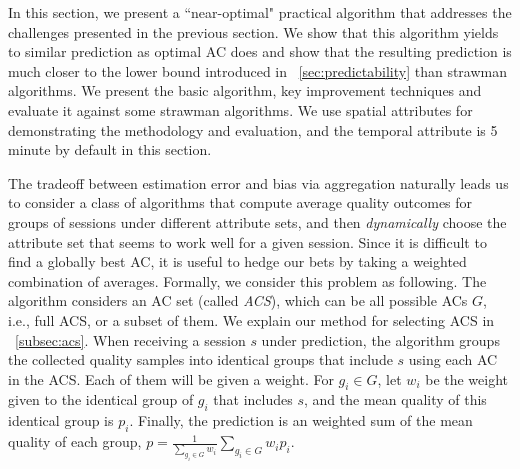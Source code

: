 \label{sec:prediction}
In this section, we present a ``near-optimal" practical algorithm that addresses the challenges presented in the previous section. We show that this algorithm yields to similar prediction as optimal AC does and show that the resulting prediction is much closer to the lower bound introduced in \Section~\ref{sec:predictability} than strawman algorithms. We present the basic algorithm, key improvement techniques and evaluate it against some strawman algorithms. We use spatial attributes for demonstrating the methodology and evaluation, and the temporal attribute is 5 minute by default in this section.

The tradeoff between estimation error and bias via aggregation naturally leads us to consider a class of algorithms that compute average quality outcomes for groups of sessions under different attribute sets, and then {\it dynamically} choose the attribute set that seems to work well for a given session.  Since it is difficult to find a globally best AC, it is useful to hedge our bets by taking a weighted combination of averages.  Formally, we consider this problem as following. The algorithm considers an AC set (called {\it ACS}), which can be all possible ACs $G$, i.e., full ACS, or a subset of them. We explain our method for selecting ACS in \Section~\ref{subsec:acs}. When receiving a session $s$ under prediction, the algorithm groups the collected quality samples into identical groups that include $s$ using each AC in the ACS. Each of them will be given a weight. For $g_i\in G$, let $w_i$ be the weight given to the identical group of $g_i$ that includes $s$, and the mean quality of this identical group is $p_i$. 
Finally, the prediction is an weighted sum of the mean quality of each group, $p=\frac{1}{\sum_{g_i\in G} w_i}\sum_{g_i\in G} w_ip_i$.


